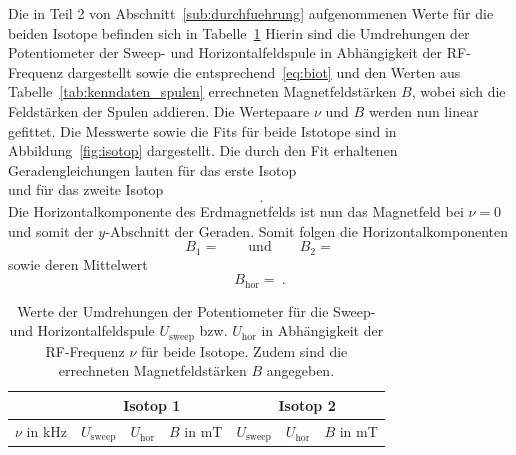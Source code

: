 Die in Teil 2 von Abschnitt~\ref{sub:durchfuehrung} aufgenommenen Werte
für die beiden Isotope befinden sich in Tabelle~\ref{tab:isotop}
Hierin sind die Umdrehungen der
Potentiometer der Sweep- und Horizontalfeldspule in Abhängigkeit der
RF-Frequenz dargestellt sowie die entsprechend~\eqref{eq:biot} und den Werten
aus Tabelle~\ref{tab:kenndaten_spulen} errechneten Magnetfeldstärken $B$, wobei
sich die Feldstärken der Spulen addieren. Die Wertepaare $\nu$ und $B$ werden
nun linear gefittet. Die Messwerte sowie die Fits für beide Istotope sind in
Abbildung~\ref{fig:isotop} dargestellt.
Die durch den Fit erhaltenen Geradengleichungen lauten für das erste Isotop
\begin{equation}
  
  \label{eq:gerade_1}
\end{equation}
und für das zweite Isotop
\begin{equation}
  ~.
  \label{eq:gerade_2}
\end{equation}
Die Horizontalkomponente des Erdmagnetfelds ist nun das Magnetfeld bei $\nu =
0$ und somit der $y$-Abschnitt der Geraden. Somit folgen die
Horizontalkomponenten
\begin{equation}
  B_1 = \qquad \text{und} \qquad
  B_2 = 
\end{equation}
sowie deren Mittelwert
\begin{equation}
  B_\text{hor} = ~.
\end{equation}

\begin{table}[htpb]
  \centering
  \begin{tabular}{c|cc||c|cc||c}
      \midrule
      \midrule
      & \multicolumn{3}{c|}{Isotop 1} &
      \multicolumn{3}{c}{Isotop 2} \\
      \midrule
      $\nu$ in \si{\kilo\hertz} & $U_\text{sweep} $ & $U_\text{hor}$ & $B$ in
      \si{\milli\tesla} &
      $U_\text{sweep} $ & $U_\text{hor}$ & $B$ in
      \si{\milli\tesla} \\
      \midrule
      
      \midrule
      \midrule
    \end{tabular}
    \caption{Werte der Umdrehungen der Potentiometer für die Sweep- und
      Horizontalfeldspule $U_\text{sweep}$ bzw. $U_\text{hor}$
      in Abhängigkeit der RF-Frequenz $\nu$ für beide Isotope.
      Zudem sind die errechneten Magnetfeldstärken $B$ angegeben.}
    \label{tab:isotop}
\end{table}

